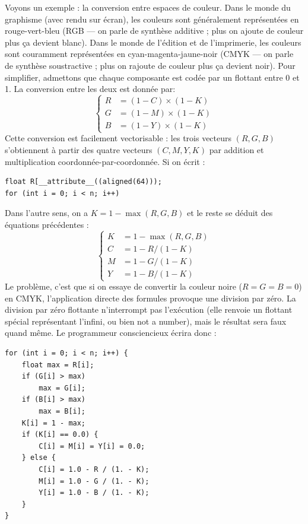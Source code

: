 Voyons un exemple : la conversion entre espaces de couleur. Dans le monde du
graphisme (avec rendu sur écran), les couleurs sont généralement représentées en
rouge-vert-bleu (RGB --- on parle de synthèse additive ; plus on ajoute de
couleur plus ça devient blanc). Dans le monde de l'édition et de l'imprimerie,
les couleurs sont couramment représentées en cyan-magenta-jaune-noir (CMYK ---
on parle de synthèse soustractive ; plus on rajoute de couleur plus ça devient
noir). Pour simplifier, admettons que chaque composante est codée par un
flottant entre 0 et 1. La conversion entre les deux est donnée par:
\[
  \left\{
    \begin{array}{rl}
      R &= (1-C) \times (1 - K) \\
      G &= (1-M) \times (1 - K) \\
      B &= (1-Y) \times (1 - K)
    \end{array}
    \right.
\]
Cette conversion est facilement vectorisable : les trois vecteurs $(R, G, B)$
s'obtiennent à partir des quatre vecteurs $(C, M, Y, K)$ par addition et
multiplication coordonnée-par-coordonnée. Si on écrit :

\begin{verbatim}
float R[__attribute__((aligned(64)));
for (int i = 0; i < n; i++)
\end{verbatim}


Dans l'autre sens, on a $K = 1 - \max(R, G, B)$ et le reste se déduit des
équations précédentes :
\[
  \left\{
    \begin{array}{rl}
      K &= 1 - \max(R, G, B) \\
      C &= 1 - R  / (1 - K) \\
      M &= 1 - G  / (1 - K) \\
      Y &= 1 - B  / (1 - K)
    \end{array}
    \right.
\]
Le problème, c'est que si on essaye de convertir la couleur noire ($R=G=B=0$) en
CMYK, l'application directe des formules provoque une division par zéro. La
division par zéro flottante n'interrompt pas l'exécution (elle renvoie un
flottant spécial représentant l'infini, ou bien \og not a number\fg), mais le
résultat sera faux quand même. Le programmeur consciencieux écrira donc :
\begin{verbatim}
for (int i = 0; i < n; i++) {
    float max = R[i];
    if (G[i] > max)
        max = G[i];
    if (B[i] > max)
        max = B[i];
    K[i] = 1 - max;
    if (K[i] == 0.0) {
        C[i] = M[i] = Y[i] = 0.0;
    } else {
        C[i] = 1.0 - R / (1. - K);
        M[i] = 1.0 - G / (1. - K);
        Y[i] = 1.0 - B / (1. - K);
    }
}
\end{verbatim}

